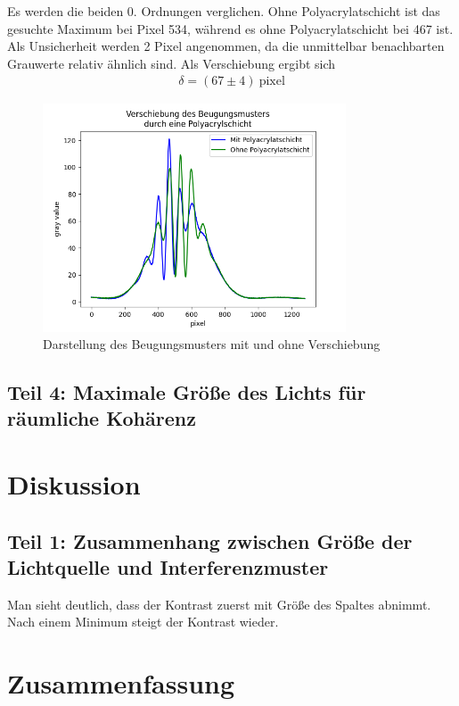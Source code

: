 \documentclass{article}
\begin{document}
Es werden die beiden 0. Ordnungen verglichen. Ohne Polyacrylatschicht ist das gesuchte Maximum bei Pixel 534, während es ohne Polyacrylatschicht bei 467 ist. Als Unsicherheit werden 2 Pixel angenommen, da die unmittelbar benachbarten Grauwerte relativ ähnlich sind. Als Verschiebung ergibt sich
\begin{align*}
\delta = (67 \pm 4)~\text{pixel}
\end{align*}

\begin{figure}[H]
\centering
\caption{Darstellung des Beugungsmusters mit und ohne Verschiebung}
\includegraphics[width=9cm]{shift_noshift.png}
\end{figure}

\subsection{Teil 4: Maximale Größe des Lichts für räumliche Kohärenz}



\section{Diskussion}

\subsection{Teil 1: Zusammenhang zwischen Größe der Lichtquelle und Interferenzmuster}


Man sieht deutlich, dass der Kontrast zuerst mit Größe des Spaltes abnimmt. Nach einem Minimum steigt der Kontrast wieder.




\section{Zusammenfassung}
\end{document}
